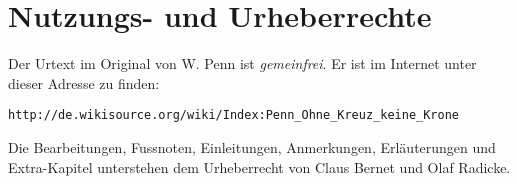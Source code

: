 \chapter{Nutzungs- und Urheberrechte}
Der Urtext im Original von W. Penn ist \textit{gemeinfrei}. Er ist im Internet
unter dieser Adresse zu finden:

\begin{center}
\texttt{http://de.wikisource.org/wiki/Index:Penn\_Ohne\_Kreuz\_keine\_Krone}
\end{center}

Die Bearbeitungen, Fussnoten, Einleitungen, Anmerkungen, Erläuterungen und
Extra-Kapitel unterstehen dem Urheberrecht von Claus Bernet und Olaf Radicke.





